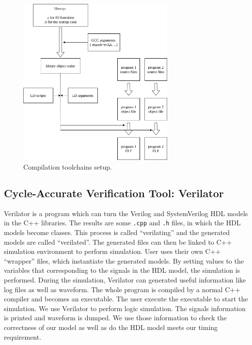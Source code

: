 \begin{figure}[!htp]
    \centering
    \includegraphics[width=0.7\textwidth]{figure/compilation.png}
    \caption{Compilation toolchains setup.}
    \label{fig:compilation}
\end{figure}

\subsection{Cycle-Accurate Verification Tool: Verilator} %

Verilator is a program which can turn the Verilog and SystemVerilog HDL models in the C++ libraries. The results are some \texttt{.cpp} and \texttt{.h} files, in which the HDL models become classes. This process is called ``verilating'' and the generated models are called ``verilated''. The generated files can then be linked to C++ simulation environment to perform simulation. User uses their own C++ ``wrapper'' files, which instantiate the generated models. By setting values to the variables that corresponding to the signals in the HDL model, the simulation is performed. During the simulation, Verilator can generated useful information like log files as well as waveform. The whole program is compiled by a normal C++ compiler and becomes an executable. The user execute the executable to start the simulation. We use Verilator to perform logic simulation. The signals information is printed and waveform is dumped. We use those information to check the correctness of our model as well as do the HDL model meets our timing requirement.

